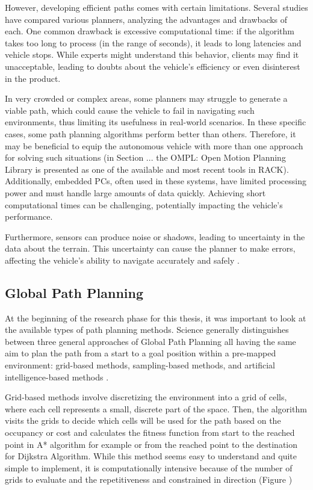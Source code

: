 However, developing efficient paths comes with certain limitations. Several studies have compared 
various planners, analyzing the advantages and drawbacks of each. One common drawback is excessive 
computational time: if the algorithm takes too long to process (in the range of seconds), it 
leads to long latencies and vehicle stops. While experts might understand this behavior, clients 
may find it unacceptable, leading to doubts about the vehicle's efficiency or even disinterest in the product.

In very crowded or complex areas, some planners may struggle to generate a viable path, which 
could cause the vehicle to fail in navigating such environments, thus limiting its usefulness 
in real-world scenarios. In these specific cases, some path planning algorithms perform better 
than others. Therefore, it may be beneficial to equip the autonomous vehicle with more than one 
approach for solving such situations (in Section ... the OMPL: Open Motion Planning Library is 
presented as one of the available and most recent tools in RACK). Additionally, embedded PCs, 
often used in these systems, have limited processing power and must handle large amounts of data 
quickly. Achieving short computational times can be challenging, potentially impacting the vehicle's performance.

Furthermore, sensors can produce noise or shadows, leading to uncertainty in the data about the 
terrain. This uncertainty can cause the planner to make errors, affecting the vehicle’s ability 
to navigate accurately and safely \cite{R12}.

\subsection{Global Path Planning}

At the beginning of the research phase for this thesis, it was important to look at the available types 
of path planning methods. Science generally distinguishes between three general approaches of Global 
Path Planning all having the same aim to plan the path from a start to a goal position within a pre-mapped 
environment:  grid-based methods, sampling-based methods, and artificial intelligence-based methods \cite{R13}. 

Grid-based methods involve discretizing the environment into a grid of cells, where each cell represents 
a small, discrete part of the space. Then, the algorithm visits the grids to decide which cells will 
be used for the path based on the occupancy or cost and calculates the fitness function from start to 
the reached point in A* algorithm for example or from the reached point to the destination for Dijkstra 
Algorithm. While this method seems easy to understand and quite simple to implement, it is 
computationally intensive because of the number of grids to evaluate and the repetitiveness 
and constrained in direction (Figure ) 

